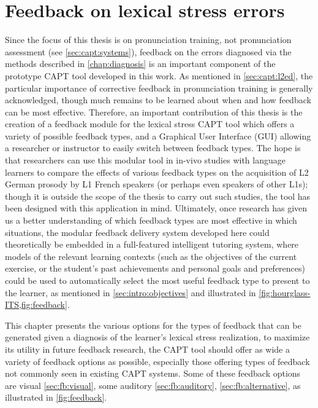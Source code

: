 %
%
\chapter{Feedback on lexical stress errors}
\label{chap:feedback}


Since the focus of this thesis is on pronunciation training, not pronunciation assessment (see \cref{sec:capt:systems}), feedback on the errors diagnosed via the methods described in \cref{chap:diagnosis} is an important component of the prototype CAPT tool developed in this work. As mentioned in \cref{sec:capt:l2ed}, the particular importance of corrective feedback in pronunciation training is generally acknowledged,
though much remains to be learned about when and how feedback can be most effective. Therefore, an important contribution of this thesis is the creation of a feedback module for the lexical stress CAPT tool which offers a variety of possible feedback types, and a Graphical User Interface (GUI) allowing a researcher or instructor to easily switch between feedback types. The hope is that researchers can use this modular tool in in-vivo studies with language learners to compare the effects of various feedback types on the acquisition of L2 German prosody by L1 French speakers (or perhaps even speakers of other L1s); though it is outside the scope of the thesis to carry out 
such studies,
the tool has been designed 
with this application in mind.
Ultimately, once research has given us a better understanding of which feedback types are most effective in which situations, the modular feedback delivery system developed here could theoretically be embedded in a full-featured intelligent tutoring system, where models of the relevant learning contexts (such as  the objectives of the current exercise, or the student's past achievements and personal goals and preferences) could be used to automatically select the most useful feedback type to present to the learner, as mentioned in \cref{sec:intro:objectives} and illustrated in \cref{fig:hourglass-ITS,fig:feedback}.

This chapter presents the various options for the types of feedback that can be generated given a diagnosis of the learner's lexical stress realization, 
 to maximize its utility in future feedback research, the CAPT tool should offer as wide a variety of feedback options as possible, especially those offering types of feedback not commonly seen in existing CAPT systems. 
	Some of these feedback options are visual \cref{sec:fb:visual}, some auditory \cref{sec:fb:auditory},  \cref{sec:fb:alternative}, as illustrated in \cref{fig:feedback}. 

